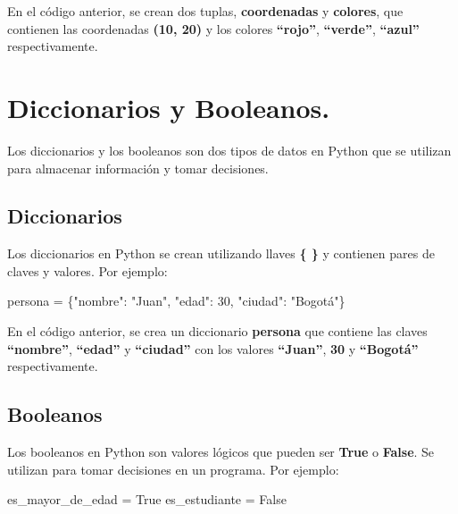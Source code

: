 \documentclass[
  a4paper,
  DIV=11,
  numbers=noendperiod,
  onepage,
  openany]{scrreprt}
\newenvironment{Shaded}{\begin{snugshade}}{\end{snugshade}}
\newcommand{\DecValTok}[1]{\textcolor[rgb]{0.68,0.00,0.00}{#1}}
\newcommand{\NormalTok}[1]{\textcolor[rgb]{0.00,0.23,0.31}{#1}}
\newcommand{\OperatorTok}[1]{\textcolor[rgb]{0.37,0.37,0.37}{#1}}
\newcommand{\StringTok}[1]{\textcolor[rgb]{0.13,0.47,0.30}{#1}}
\newcommand{\VariableTok}[1]{\textcolor[rgb]{0.07,0.07,0.07}{#1}}
\begin{document}
En el código anterior, se crean dos tuplas, \textbf{coordenadas} y
\textbf{colores}, que contienen las coordenadas \textbf{(10, 20)} y los
colores \textbf{``rojo''}, \textbf{``verde''}, \textbf{``azul''}
respectivamente.

\section{Diccionarios y Booleanos.}\label{diccionarios-y-booleanos.}

Los diccionarios y los booleanos son dos tipos de datos en Python que se
utilizan para almacenar información y tomar decisiones.

\subsection{Diccionarios}\label{diccionarios}

Los diccionarios en Python se crean utilizando llaves \textbf{\{ \}} y
contienen pares de claves y valores. Por ejemplo:

\begin{Shaded}
\begin{Highlighting}[]
\NormalTok{persona }\OperatorTok{=}\NormalTok{ \{}\StringTok{"nombre"}\NormalTok{: }\StringTok{"Juan"}\NormalTok{, }\StringTok{"edad"}\NormalTok{: }\DecValTok{30}\NormalTok{, }\StringTok{"ciudad"}\NormalTok{: }\StringTok{"Bogotá"}\NormalTok{\}}
\end{Highlighting}
\end{Shaded}

En el código anterior, se crea un diccionario \textbf{persona} que
contiene las claves \textbf{``nombre''}, \textbf{``edad''} y
\textbf{``ciudad''} con los valores \textbf{``Juan''}, \textbf{30} y
\textbf{``Bogotá''} respectivamente.

\subsection{Booleanos}\label{booleanos}

Los booleanos en Python son valores lógicos que pueden ser \textbf{True}
o \textbf{False}. Se utilizan para tomar decisiones en un programa. Por
ejemplo:

\begin{Shaded}
\begin{Highlighting}[]
\NormalTok{es\_mayor\_de\_edad }\OperatorTok{=} \VariableTok{True}
\NormalTok{es\_estudiante }\OperatorTok{=} \VariableTok{False}
\end{Highlighting}
\end{Shaded}
\end{document}
